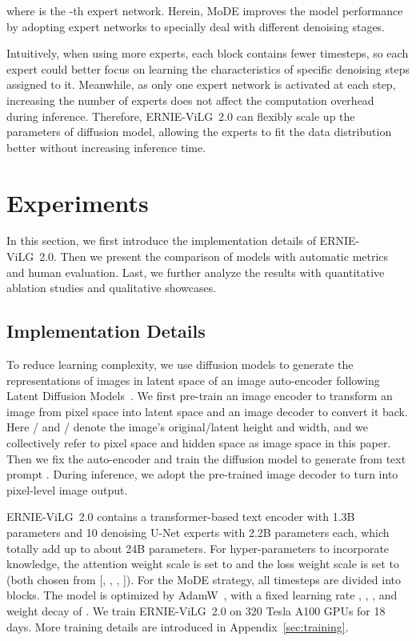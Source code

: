 \documentclass[10pt,twocolumn,letterpaper]{article}
\begin{document}
where  is the -th expert network.
Herein, MoDE improves the model performance by adopting expert networks to specially deal with different denoising stages.

Intuitively, when using more experts, each block contains fewer timesteps, so each expert could better focus on learning the characteristics of specific denoising steps assigned to it.
Meanwhile, as only one expert network is activated at each step, increasing the number of experts does not affect the computation overhead during inference. 
Therefore, ERNIE-ViLG~2.0 can flexibly scale up the parameters of diffusion model, allowing the experts to fit the data distribution better without increasing inference time.



\section{Experiments}

In this section, we first introduce the implementation details of ERNIE-ViLG~2.0. Then we present the comparison of models with automatic metrics and human evaluation. Last, we further analyze the results with quantitative ablation studies and qualitative showcases.

\subsection{Implementation Details}

To reduce learning complexity, we use diffusion models to generate the representations of images in latent space of an image auto-encoder following Latent Diffusion Models~\cite{DBLP:journals/corr/abs-2112-10752}.
We first pre-train an image encoder to transform an image  from pixel space into latent space  and an image decoder to convert it back. Here / and / denote the image's original/latent height and width, and we collectively refer to pixel space and hidden space as image space in this paper.
Then we fix the auto-encoder and train the diffusion model to generate  from text prompt .
During inference, we adopt the pre-trained image decoder to turn  into pixel-level image output.

ERNIE-ViLG~2.0 contains a transformer-based text encoder with 1.3B parameters and 10 denoising U-Net experts with 2.2B parameters each, which totally add up to about 24B parameters.
For hyper-parameters to incorporate knowledge, the attention weight scale  is set to  and the loss weight scale  is set to  (both chosen from [, , , ]).
For the MoDE strategy, all timesteps are divided into  blocks.
The model is optimized by AdamW~\cite{DBLP:conf/iclr/LoshchilovH19}, with a fixed learning rate , , , and weight decay of .
We train ERNIE-ViLG~2.0 on 320 Tesla A100 GPUs for 18 days.
More training details are introduced in Appendix~\ref{sec:training}.
\end{document}
